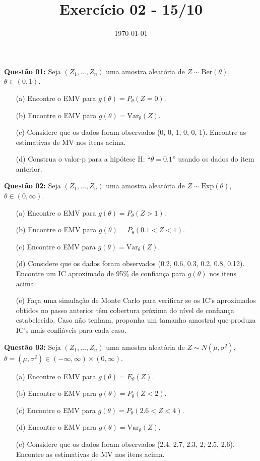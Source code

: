 \documentclass[a4paper]{article}
\date{\today}
\title{Exercício 02 - 15/10}
\begin{document}
    \header{}

\textbf{Questão 01:}  
Seja $(Z_1, \ldots, Z_n)$ uma amostra aleatória de $Z \sim \text{Ber}(\theta)$, $\theta \in (0,1)$.
\begin{itemize}
  \item[(a)] Encontre o EMV para $g(\theta) = P_\theta(Z = 0)$.
  \item[(b)] Encontre o EMV para $g(\theta) = \mathrm{Var}_\theta(Z)$.
  \item[(c)] Considere que os dados foram observados (0, 0, 1, 0, 0, 1). Encontre as estimativas de MV nos itens acima.
  \item[(d)] Construa o valor-p para a hipótese H: ``$\theta = 0.1$'' usando os dados do item anterior.
\end{itemize}
    \begin{answer}[]
 
    \end{answer}

\textbf{Questão 02:}  
Seja $(Z_1, \ldots, Z_n)$ uma amostra aleatória de $Z \sim \text{Exp}(\theta)$, $\theta \in (0,\infty)$.
\begin{itemize}
  \item[(a)] Encontre o EMV para $g(\theta) = P_\theta(Z > 1)$.
  \item[(b)] Encontre o EMV para $g(\theta) = P_\theta(0.1 < Z < 1)$.
  \item[(c)] Encontre o EMV para $g(\theta) = \mathrm{Var}_\theta(Z)$.
  \item[(d)] Considere que os dados foram observados (0.2, 0.6, 0.3, 0.2, 0.8, 0.12). Encontre um IC aproximado de 95\% de confiança para $g(\theta)$ nos itens acima.
  \item[(e)] Faça uma simulação de Monte Carlo para verificar se os IC's aproximados obtidos no passo anterior têm cobertura próxima do nível de confiança estabelecido. Caso não tenham, proponha um tamanho amostral que produza IC's mais confiáveis para cada caso.
\end{itemize}

    \begin{answer}[]

    \end{answer}

\textbf{Questão 03:}  
Seja $(Z_1, \ldots, Z_n)$ uma amostra aleatória de $Z \sim N(\mu, \sigma^2)$, $\theta = (\mu, \sigma^2) \in (-\infty,\infty) \times (0,\infty)$.
\begin{itemize}
  \item[(a)] Encontre o EMV para $g(\theta) = E_\theta(Z)$.
  \item[(b)] Encontre o EMV para $g(\theta) = P_\theta(Z < 2)$.
  \item[(c)] Encontre o EMV para $g(\theta) = P_\theta(2.6 < Z < 4)$.
  \item[(d)] Encontre o EMV para $g(\theta) = \mathrm{Var}_\theta(Z)$.
  \item[(e)] Considere que os dados foram observados (2.4, 2.7, 2.3, 2, 2.5, 2.6). Encontre as estimativas de MV nos itens acima.
\end{itemize}
\end{document}
